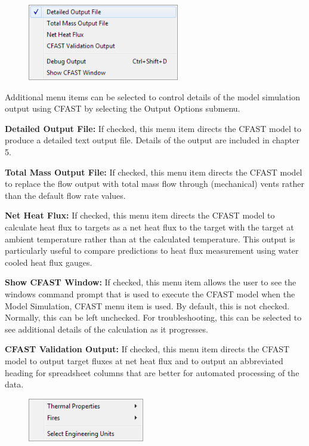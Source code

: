 \begin{figure}
  \includegraphics[width=2.6in]{FIGURES/Running_CFAST/Output_Options_Menu}
\end{figure}

Additional menu items can be selected to control details of the model simulation output using CFAST by selecting the Output Options submenu.

\textbf{Detailed Output File:} If checked, this menu item directs the CFAST model to produce a detailed text output file.  Details of the output are included in chapter 5.

\textbf{Total Mass Output File:} If checked, this menu item directs the CFAST model to replace the flow output with total mass flow through (mechanical) vents rather than the default flow rate values.

\textbf{Net Heat Flux:}  If checked, this menu item directs the CFAST model to calculate heat flux to targets as a net heat flux to the target with the target at ambient temperature rather than at the calculated temperature.  This output is particularly useful to compare predictions to heat flux measurement using water cooled heat flux gauges.

\textbf{Show CFAST Window:} If checked, this menu item allows the user to see the windows command prompt that is used to execute the CFAST model when the Model Simulation, CFAST menu item is used.  By default, this is not checked.  Normally, this can be left unchecked.  For troubleshooting, this can be selected to see additional details of the calculation as it progresses.

\textbf{CFAST Validation Output:} If checked, this menu item directs the CFAST model to output target fluxes at net heat flux and to output an abbreviated heading for spreadsheet columns that are better for automated processing of the data.


\begin{figure}
  \includegraphics[width=2in]{FIGURES/Running_CFAST/Tools_Menu}
\end{figure}

